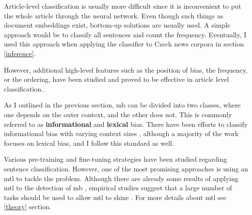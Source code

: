 Article-level classification is usually more difficult since it is inconvenient to put the whole article through the neural network. Even though such things as document embeddings exist, bottom-up solutions are usually used. A simple approach would be to classify all sentences and count the frequency. Eventually, I used this approach when applying the classifier to Czech news corpora in section \ref{inference}.

However, additional high-level features such as the position of bias, the frequency, or the ordering, have been studied and proved to be effective in article level classification.\cite{chen2020detecting,chen-etal-2020-analyzing}.

As I outlined in the previous section, \gls{mb} can be divided into two classes, where one depends on the outer context, and the other does not. This is commonly referred to as \textbf{informational} and \textbf{lexical} bias. There have been efforts to classify informational bias with varying context sizes \cite{van2020context}, although a majority of the work focuses on lexical bias, and I follow this standard as well.

Various pre-training and fine-tuning strategies have been studied regarding sentence classification. However, one of the most promising approaches is using an \Gls{mtl} to tackle the problem. Although there are already some results of applying \Gls{mtl} to the detection of \gls{mb} \cite{lee2021unifying,spindeexploiting}, empirical studies suggest that a large number of tasks should be used to allow \Gls{mtl} to shine \cite{aribandi2021ext5}. For more details about \gls{mtl} see \ref{theory} section.

\let\cleardoublepage\clearpage